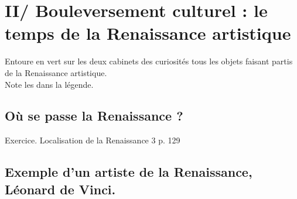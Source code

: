 \documentclass{beamer}
\begin{document}





\section{II/ Bouleversement culturel : le temps de la Renaissance artistique}

\begin{frame}
Entoure en vert sur les deux cabinets des curiosités tous les objets faisant partis de la Renaissance artistique. \\
Note les dans la légende.

\end{frame}


\subsection{Où se passe la Renaissance ?}

\begin{frame}{Exercice. Localisation de la Renaissance}
3 p. 129
\end{frame}

\subsection{Exemple d'un artiste de la Renaissance, Léonard de Vinci.}
\end{document}
